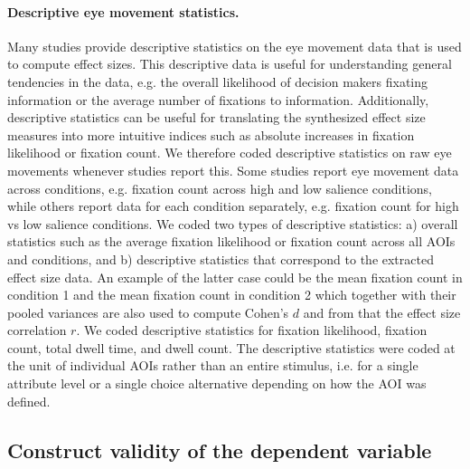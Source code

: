 \paragraph{Descriptive eye movement statistics.} Many studies provide descriptive statistics on the eye movement data that is used to compute effect sizes. This descriptive data is useful for understanding general tendencies in the data, e.g. the overall likelihood of decision makers fixating information or the average number of fixations to information. Additionally, descriptive statistics can be useful for translating the synthesized effect size measures into more intuitive indices such as absolute increases in fixation likelihood or fixation count. We therefore coded descriptive statistics on raw eye movements whenever studies report this. Some studies report eye movement data across conditions, e.g. fixation count across high and low salience conditions, while others report data for each condition separately, e.g. fixation count for high vs low salience conditions. We coded two types of descriptive statistics: a) overall statistics such as the average fixation likelihood or fixation count across all AOIs and conditions, and b) descriptive statistics that correspond to the extracted effect size data. An example of the latter case could be the mean fixation count in condition 1 and the mean fixation count in condition 2 which together with their pooled variances are also used to compute Cohen's $d$ and from that the effect size correlation $r$. We coded descriptive statistics for fixation likelihood, fixation count, total dwell time, and dwell count. The descriptive statistics were coded at the unit of individual AOIs rather than an entire stimulus, i.e. for a single attribute level or a single choice alternative depending on how the AOI was defined.  


\subsection{Construct validity of the dependent variable}

